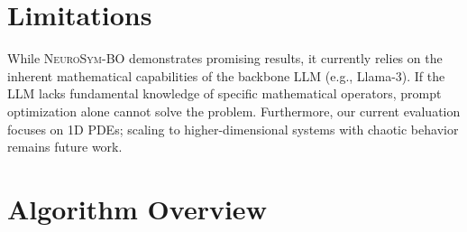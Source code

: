 \documentclass[twoside,11pt]{article}
\newcommand{\1}{{\bf 1}}
\newcommand{\0}{{\bf 0}}
\begin{document}
\section*{Limitations}
While \textsc{NeuroSym-BO} demonstrates promising results, it currently relies on the inherent mathematical capabilities of the backbone LLM (e.g., Llama-3). If the LLM lacks fundamental knowledge of specific mathematical operators, prompt optimization alone cannot solve the problem. Furthermore, our current evaluation focuses on 1D PDEs; scaling to higher-dimensional systems with chaotic behavior remains future work.










\clearpage
\appendix

\section{Algorithm Overview}
\label{app:algorithm} 
\end{document}
